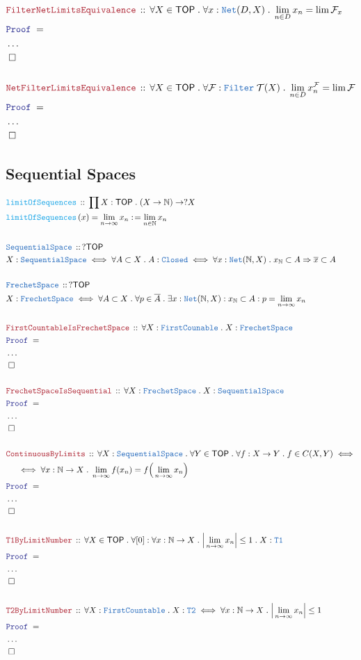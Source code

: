\documentclass[12pt]{scrartcl}
\newcommand{\TYPE}[1]{\textcolor{NavyBlue}{\mathtt{#1}}}
\newcommand{\FUNC}[1]{\textcolor{Cerulean}{\mathtt{#1}}}
\newcommand{\LOGIC}[1]{\textcolor{Blue}{\mathtt{#1}}}
\newcommand{\THM}[1]{\textcolor{Maroon}{\mathtt{#1}}}
\renewcommand{\.}{\; . \;}
\newcommand{\de}{: \kern 0.1pc =}
\newcommand{\Act}[1]{\left( #1 \right)}
\newcommand{\Theorem}[2]{& \THM{#1} \, :: \, #2 \\ & \Proof = \\ }
\newcommand{\DeclareType}[2]{& \TYPE{#1} \, :: \, #2 \\}
\newcommand{\DefineType}[3]{& #1 : \TYPE{#2} \iff #3 \\}
\newcommand{\DeclareFunc}[2]{& \FUNC{#1} \, :: \, #2 \\}
\newcommand{\DefineNamedFunc}[4]{&  \FUNC{#1}\Act{#2} = #3 \de #4 \\}
\newcommand{\NewLine}{\\ & \kern 1pc}
\newcommand{\Page}[1]{ \begin{align*} #1 \end{align*}   }
\newcommand{\NoProof}{ & \ldots \\ \EndProof}
\newcommand{\Imply}{\Rightarrow}
\newcommand{\Nat}{\mathbb{N} }
\newcommand{\QED}{\; \square}
\newcommand{\EndProof}{& \QED \\}
\newcommand{\Proof}{\LOGIC{Proof} \; }
\newcommand{\TOP}{\mathsf{TOP}}
\newcommand{\T}{\mathcal{T}}
\newcommand{\F}{\mathcal{F}}
\begin{document}
\newpage
\Page{
	\Theorem{FilterNetLimitsEquivalence}
	{
		\forall X \in \TOP \. 
		\forall x : \TYPE{Net}(D,X) \.
		\lim_{n \in D} x_n = \lim \F_x
	}
	\NoProof
	\\
	\Theorem{NetFilterLimitsEquivalence}
	{
		\forall X \in \TOP \. 
		\forall \F : \TYPE{Filter}\; \T(X) \.
		\lim_{n \in D} x_n^\F  = \lim \F
	}
	\NoProof
}
\newpage
\subsection{Sequential Spaces}
\Page{
	\DeclareFunc{limitOfSequences}
	{
		\prod X : \TOP \. 
		(X \to \Nat) \to ?X
	}
	\DefineNamedFunc{limitOfSequences}
	{ x }{ \lim_{n \to \infty} x_n  }{\lim_{n \in \Nat} x_n}
	\\
	\DeclareType{SequentialSpace}
	{
		?\TOP
	}
	\DefineType{X}{SequentialSpace}
	{
		\forall A \subset X \.
		A : \TYPE{Closed} \iff 
		\forall x : \TYPE{Net}(\Nat, X) \. x_{\Nat} \subset A \Imply \overline{x} \subset A
	}
	\\
	\DeclareType{FrechetSpace}
	{
		?\TOP
	}
	\DefineType{X}{FrechetSpace}
	{
		\forall A \subset X \.
		\forall p \in \overline{A} \.
		\exists x : \TYPE{Net}(\Nat,X) : x_\Nat \subset A : p = \lim_{n \to \infty} x_n
	}
	\\
	\Theorem{FirstCountableIsFrechetSpace}
	{
		\forall X : \TYPE{FirstCounable} \.
		X : \TYPE{FrechetSpace} 
	}
	\NoProof
	\\
	\Theorem{FrechetSpaceIsSequential}
	{
		\forall X : \TYPE{FrechetSpace} \.
		X : \TYPE{SequentialSpace} 
	}
	\NoProof
	\\
	\Theorem{ContinuousByLimits}
	{
		\forall X : \TYPE{SequentialSpace} \.
		\forall Y \in \TOP \.
		\forall f : X \to Y  \.
		f \in C(X,Y)
		\iff \NewLine \iff
		\forall x : \Nat \to X \.
		\lim_{n \to \infty} f(x_n) = f\Big( \lim_{n \to \infty} x_n \Big)
	}
	\NoProof
	\\
	\Theorem{T1ByLimitNumber}
	{
		\forall X \in \TOP \.
		\forall [0] : \forall x : \Nat \to X \. 
		\Big|\lim_{n \to \infty} x_n\Big| \le 1 \.
		X : \TYPE{T1}
	}
	\NoProof
	\\
	\Theorem{T2ByLimitNumber}
	{
		\forall X : \TYPE{FirstCountable} \.
		X : \TYPE{T2} 
		\iff
		\forall x : \Nat \to X \. \Big| \lim_{n\to\infty} x_n \Big| \le 1
	}
	\NoProof
}
\newpage
\end{document}
